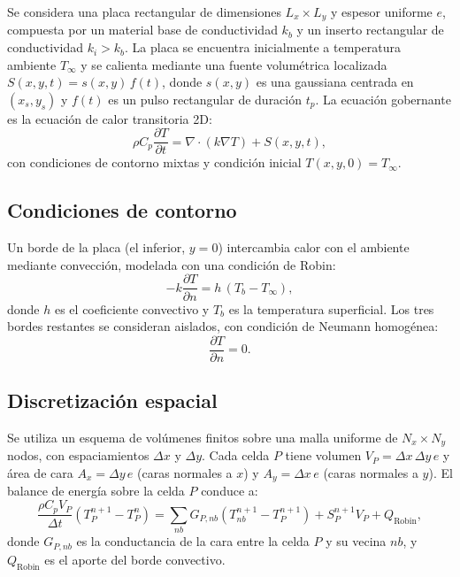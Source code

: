 \documentclass[11pt,a4paper]{article}
\begin{document}
Se considera una placa rectangular de dimensiones $L_x \times L_y$ y espesor uniforme $e$, compuesta por un material base de conductividad $k_b$ y un inserto rectangular de conductividad $k_i > k_b$. La placa se encuentra inicialmente a temperatura ambiente $T_\infty$ y se calienta mediante una fuente volumétrica localizada $S(x,y,t) = s(x,y)\,f(t)$, donde $s(x,y)$ es una gaussiana centrada en $(x_s, y_s)$ y $f(t)$ es un pulso rectangular de duración $t_p$. La ecuación gobernante es la ecuación de calor transitoria 2D:
\begin{equation}
\rho C_p \frac{\partial T}{\partial t} = \nabla \cdot (k \nabla T) + S(x,y,t),
\label{eq:calor}
\end{equation}
con condiciones de contorno mixtas y condición inicial $T(x,y,0) = T_\infty$.

\subsection{Condiciones de contorno}

Un borde de la placa (el inferior, $y=0$) intercambia calor con el ambiente mediante convección, modelada con una condición de Robin:
\begin{equation}
-k \frac{\partial T}{\partial n} = h\,(T_b - T_\infty),
\label{eq:robin}
\end{equation}
donde $h$ es el coeficiente convectivo y $T_b$ es la temperatura superficial. Los tres bordes restantes se consideran aislados, con condición de Neumann homogénea:
\begin{equation}
\frac{\partial T}{\partial n} = 0.
\label{eq:neumann}
\end{equation}

\subsection{Discretización espacial}

Se utiliza un esquema de volúmenes finitos sobre una malla uniforme de $N_x \times N_y$ nodos, con espaciamientos $\Delta x$ y $\Delta y$. Cada celda $P$ tiene volumen $V_P = \Delta x\,\Delta y\,e$ y área de cara $A_x = \Delta y\,e$ (caras normales a $x$) y $A_y = \Delta x\,e$ (caras normales a $y$). El balance de energía sobre la celda $P$ conduce a:
\begin{equation}
\frac{\rho C_p V_P}{\Delta t}\left(T_P^{n+1} - T_P^n\right) = \sum_{nb} G_{P,nb}\left(T_{nb}^{n+1} - T_P^{n+1}\right) + S_P^{n+1} V_P + Q_{\text{Robin}},
\label{eq:balance}
\end{equation}
donde $G_{P,nb}$ es la conductancia de la cara entre la celda $P$ y su vecina $nb$, y $Q_{\text{Robin}}$ es el aporte del borde convectivo.
\end{document}

